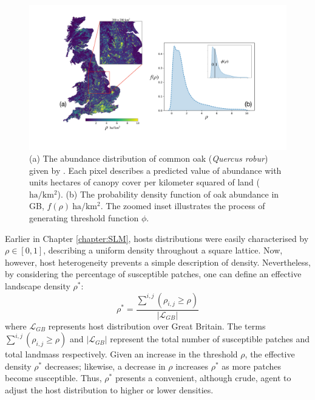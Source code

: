 \newpage

\begin{figure}
    \centering
    \includegraphics[scale=0.32]{chapter4/figures/figure3.pdf}
    \caption{
    (a) The abundance distribution of common oak (\textit{Quercus robur}) given by \cite{hill.data}. Each pixel describes a predicted value of abundance with units hectares of canopy cover per kilometer squared of land ($\mathrm{ha/km^2}$). 
    (b) The probability density function of oak abundance in GB, $f(\rho)\ \mathrm{ha/km^2}$. 
    The zoomed inset illustrates the process of generating threshold function $\phi$.}
    \label{fig:uk-oak-l.hill}
\end{figure}

Earlier in Chapter \ref{chapter:SLM}, hosts distributions were easily characterised by $\rho \in [0, 1]$, 
describing a uniform density throughout a square lattice.
Now, however, host heterogeneity prevents a simple description of density.
Nevertheless, by considering the percentage of susceptible patches,
one can define an effective landscape density $\rho^*$:
\begin{equation}
    \label{eq:rho_eff}
  \rho^{*} = \frac{\sum^{i, j} ( \rho_{i,j} \geq \rho )}{|\mathcal{L}_{GB}|}
\end{equation}
where $\mathcal{L}_{GB}$ represents host distribution over Great Britain. 
The terms $\sum^{i, j} (\rho_{i,j} \geq \rho)$ and $|\mathcal{L}_{GB}|$ represent 
the total number of susceptible patches and total landmass respectively. 
Given an increase in the threshold $\rho$, the effective density $\rho^*$ decreases; 
likewise, a decrease in $\rho$ increases $\rho^*$ as more patches become susceptible. 
Thus, $\rho^{*}$ presents a convenient, although crude, agent
to adjust the host distribution to higher or lower densities.

